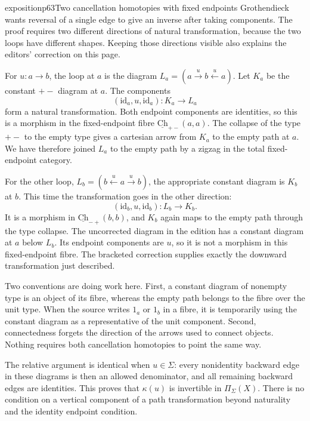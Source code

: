 \begin{dcomment}{exposition}{p63}{Two cancellation homotopies with fixed endpoints}
Grothendieck wants reversal of a single edge to give an inverse after taking components. The proof requires two different directions of natural transformation, because the two loops have different shapes. Keeping those directions visible also explains the editors' correction on this page.

For $u:a\to b$, the loop at $a$ is the diagram
$L_a=(a\xrightarrow{u}b\xleftarrow{u}a)$. Let $K_a$ be the constant $+-$ diagram at $a$. The components
\[
 (\mathrm{id}_a,u,\mathrm{id}_a):K_a\longrightarrow L_a
\]
form a natural transformation. Both endpoint components are identities, so this is a morphism in the fixed-endpoint fibre
$\underline{\mathrm{Ch}}_{+-}(a,a)$. The collapse of the type $+-$ to the empty type gives a cartesian arrow from $K_a$ to the empty path at $a$. We have therefore joined $L_a$ to the empty path by a zigzag in the total fixed-endpoint category.

For the other loop, $L_b=(b\xleftarrow{u}a\xrightarrow{u}b)$, the appropriate constant diagram is $K_b$ at $b$. This time the transformation goes in the other direction:
\[
 (\mathrm{id}_b,u,\mathrm{id}_b):L_b\longrightarrow K_b.
\]
It is a morphism in $\underline{\mathrm{Ch}}_{-+}(b,b)$, and $K_b$ again maps to the empty path through the type collapse. The uncorrected diagram in the edition has a constant diagram at $a$ below $L_b$. Its endpoint components are $u$, so it is not a morphism in this fixed-endpoint fibre. The bracketed correction supplies exactly the downward transformation just described.

Two conventions are doing work here. First, a constant diagram of nonempty type is an object of its fibre, whereas the empty path belongs to the fibre over the unit type. When the source writes $1_a$ or $1_b$ in a fibre, it is temporarily using the constant diagram as a representative of the unit component. Second, connectedness forgets the direction of the arrows used to connect objects. Nothing requires both cancellation homotopies to point the same way.

The relative argument is identical when $u\in\Sigma$: every nonidentity backward edge in these diagrams is then an allowed denominator, and all remaining backward edges are identities. This proves that $\kappa(u)$ is invertible in $\Pi_\Sigma(X)$. There is no condition on a vertical component of a path transformation beyond naturality and the identity endpoint condition.
\end{dcomment}

